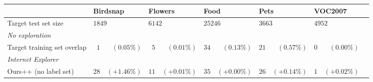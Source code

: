 \newcommand{\blue}[1]{\textcolor{Cerulean}{#1}}
\begin{table}[t]
    \centering
        \begin{adjustbox}{width=1\textwidth}
        \begin{tabular}{
            lr@{\hskip 0.12em}
            rr@{\hskip 0.12em}
            rr@{\hskip 0.12em}
            rr@{\hskip 0.12em}
            rr@{\hskip 0.12em}
            rc}
        \toprule
            &
            \multicolumn{2}{l}{Birdsnap} & 
            \multicolumn{2}{l}{Flowers} & 
            \multicolumn{2}{l}{Food} & 
            \multicolumn{2}{l}{Pets} & 
            \multicolumn{2}{l}{VOC2007} \\
        \midrule
        Target test set size                          &  \multicolumn{2}{l}{$1849$} &  \multicolumn{2}{l}{$6142$} & \multicolumn{2}{l}{$25246$} &\multicolumn{2}{l}{$3663$} &\multicolumn{2}{l}{$4952$} \\ 
        \midrule
        \textit{No exploration} \\
            \;\;\; Target training set overlap                          &  $1$ & \blue{$(0.05\%)$} &  $5$ & \blue{$(0.01\%)$}& $34$ & \blue{$(0.13\%)$} & $21$ & \blue{$(0.57\%)$} &  $0$ & \blue{$(0.00\%)$} \\
        \midrule
        \textit{Internet Explorer} \\
            \;\;\;Ours++ (no label set)                         &  $28$ & \blue{$(+1.46\%)$} & $11$ & \blue{$(+0.01\%)$} & $35$ & \blue{$(+0.00\%)$} & $26$ & \blue{$(+0.14\%)$}& $1$ & \blue{$(+0.02\%)$} \\

\end{tabular}
\end{adjustbox}
\end{table}
